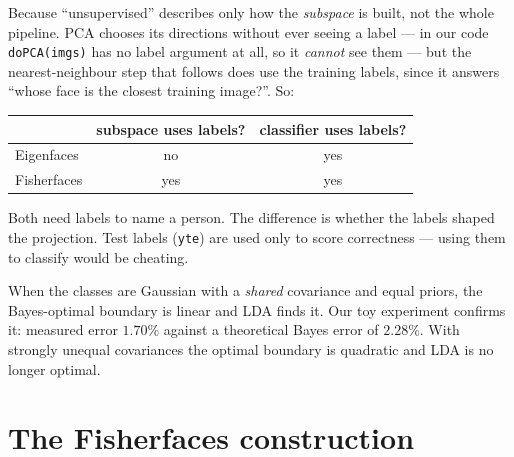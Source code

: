 \documentclass[11pt]{article}
\theoremstyle{definition}
\theoremstyle{remark}
\begin{document}
\begin{description}[leftmargin=*,style=nextline]
\item[If Eigenfaces is ``unsupervised'', how does it recognise anyone?]
Because ``unsupervised'' describes only how the \emph{subspace} is built, not the
whole pipeline. PCA chooses its directions without ever seeing a label --- in our
code \texttt{doPCA(imgs)} has no label argument at all, so it \emph{cannot} see
them --- but the nearest-neighbour step that follows does use the training labels,
since it answers ``whose face is the closest training image?''. So:
\begin{center}
\begin{tabular}{lcc}
\toprule
 & subspace uses labels? & classifier uses labels? \\
\midrule
Eigenfaces  & no  & yes \\
Fisherfaces & yes & yes \\
\bottomrule
\end{tabular}
\end{center}
Both need labels to name a person. The difference is whether the labels shaped the
projection. Test labels (\texttt{yte}) are used only to score correctness --- using
them to classify would be cheating.

\item[When is LDA actually optimal?]
When the classes are Gaussian with a \emph{shared} covariance and equal priors, the
Bayes-optimal boundary is linear and LDA finds it. Our toy experiment confirms it:
measured error $1.70\%$ against a theoretical Bayes error of $2.28\%$. With
strongly unequal covariances the optimal boundary is quadratic and LDA is no longer
optimal.

\end{description}

\section{The Fisherfaces construction}
\end{document}
